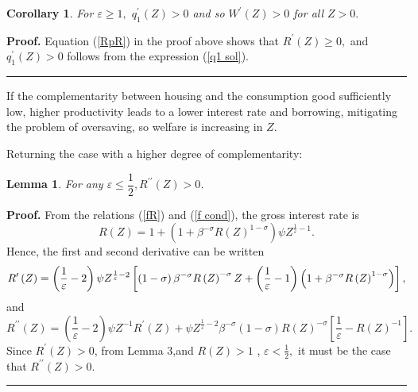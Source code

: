 \documentclass{article}
\newtheorem{corollary}[theorem]{Corollary}
\newtheorem{lemma}[theorem]{Lemma}
\newenvironment{proof}[1][Proof]{\noindent\textbf{#1.} }{\ \rule{0.5em}{0.5em}}
\begin{document}
\begin{doublespace}
\begin{corollary}
For $\varepsilon \geq 1,$ $q_{1}^{\prime }\left( Z\right) >0$ and so $%
W^{\prime }\left( Z\right) >0$ for all $Z>0.$
\end{corollary}

\begin{proof}
Equation (\ref{RpR}) in the proof above shows that $R^{\prime }\left(
Z\right) \geq 0,$ and $q_{1}^{\prime }\left( Z\right) >0$ follows from the
expression (\ref{q1 sol}).
\end{proof}

If the complementarity between housing and the consumption good sufficiently
low, higher productivity leads to a lower interest rate and borrowing,
mitigating the problem of oversaving, so welfare is increasing in $Z$.

Returning the case with a higher degree of complementarity:

\begin{lemma}
For any $\varepsilon \leq \dfrac{1}{2},R^{\prime \prime }\left( Z\right) >0$.
\end{lemma}

\begin{proof}
From the relations (\ref{fR}) and (\ref{f cond}), the gross interest rate is%
\begin{equation*}
R\left( Z\right) =1+\left( 1+\beta ^{-\sigma }R\left( Z\right) ^{1-\sigma
}\right) \psi Z^{\frac{1}{\varepsilon }-1}.
\end{equation*}%
Hence, the first and second derivative can be written%
\begin{equation*}
R^{\prime }\left( Z\right) =\left( \frac{1}{\varepsilon }-2\right) \psi Z^{%
\frac{1}{\varepsilon }-2}\left[ \left( 1-\sigma \right) \beta ^{-\sigma
}R\left( Z\right) ^{-\sigma }Z+\left( \frac{1}{\varepsilon }-1\right) \left(
1+\beta ^{-\sigma }R\left( Z\right) ^{1-\sigma }\right) \right] ,
\end{equation*}%
and%
\begin{equation*}
R^{\prime \prime }\left( Z\right) =\left( \frac{1}{\varepsilon }-2\right)
\psi Z^{-1}R^{\prime }\left( Z\right) +\psi Z^{\frac{1}{\varepsilon }%
-2}\beta ^{-\sigma }\left( 1-\sigma \right) R\left( Z\right) ^{-\sigma }%
\left[ \frac{1}{\varepsilon }-R\left( Z\right) ^{-1}\right] .
\end{equation*}%
Since $R^{\prime }\left( Z\right) >0$, from Lemma 3,and $R\left( Z\right) >1$%
, $\varepsilon <\frac{1}{2},$ it must be the case that $R^{\prime \prime
}\left( Z\right) >0.$
\end{proof}


\end{doublespace}
\end{document}
